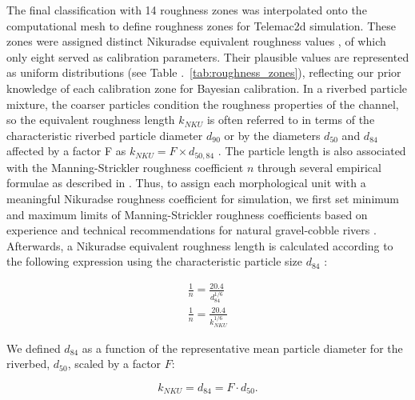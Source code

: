 The final classification with 14 roughness zones was interpolated onto the computational mesh to define roughness zones for Telemac2d simulation. These zones were assigned distinct Nikuradse equivalent roughness values , of which only eight served as calibration parameters. Their plausible values are represented as uniform distributions (see Table .~\ref{tab:roughness_zones}), reflecting our prior knowledge of each calibration zone for Bayesian calibration. In a riverbed particle mixture, the coarser particles condition the roughness properties of the channel, so the equivalent roughness length $k_{NKU}$ is often referred to in terms of the characteristic riverbed particle diameter $d_{90}$ or by the diameters $d_{50}$ and $d_{84}$ affected by a factor F as $k_{NKU} = F \times d_{50,84}$ \cite{tassi2023gaia}. The particle length is also associated with the Manning-Strickler roughness coefficient $n$ through several empirical formulae as described in . Thus, to assign each morphological unit with a meaningful Nikuradse roughness coefficient for simulation, we first set minimum and maximum limits of Manning-Strickler roughness coefficients based on experience and technical recommendations for natural gravel-cobble rivers \cite{chow1959openchannel}. Afterwards, a Nikuradse equivalent roughness length is calculated according to the following expression using the characteristic particle size $d_{84}$  \cite{rickenmann2011evaluation}:

\begin{gather}
	\frac{1}{n} = \frac{20.4}{d_{84}^{1/6}} \label{eq:mann-NIKU eq-orig} \\
	\frac{1}{n} = \frac{20.4}{k_{NKU}^{1/6}} \label{eq:mann-NIKU eq-d84}
\end{gather}

We defined $d_{84}$ as a function of the representative mean particle diameter for the riverbed, $d_{50}$, scaled by a factor $F$: 

\begin{equation} \label{eq:k-nku}
k_{NKU} = d_{84} = F \cdot d_{50}.
\end{equation}


